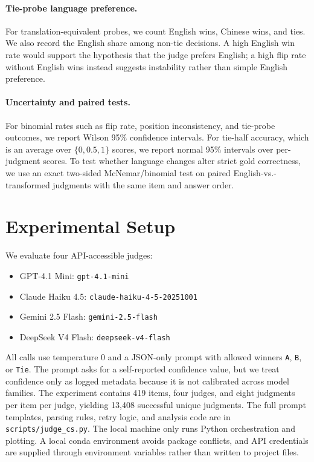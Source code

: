 \documentclass[10pt,twocolumn]{article}
\begin{document}
\paragraph{Tie-probe language preference.}
For translation-equivalent probes, we count English wins, Chinese wins, and ties. We also record the English share among non-tie decisions. A high English win rate would support the hypothesis that the judge prefers English; a high flip rate without English wins instead suggests instability rather than simple English preference.

\paragraph{Uncertainty and paired tests.}
For binomial rates such as flip rate, position inconsistency, and tie-probe outcomes, we report Wilson 95\% confidence intervals. For tie-half accuracy, which is an average over $\{0,0.5,1\}$ scores, we report normal 95\% intervals over per-judgment scores. To test whether language changes alter strict gold correctness, we use an exact two-sided McNemar/binomial test on paired English-vs.-transformed judgments with the same item and answer order.

\section{Experimental Setup}

We evaluate four API-accessible judges:
\begin{itemize}
    \item GPT-4.1 Mini: \texttt{gpt-4.1-mini}
    \item Claude Haiku 4.5: \texttt{claude-haiku-4-5-20251001}
    \item Gemini 2.5 Flash: \texttt{gemini-2.5-flash}
    \item DeepSeek V4 Flash: \texttt{deepseek-v4-flash}
\end{itemize}

All calls use temperature 0 and a JSON-only prompt with allowed winners \texttt{A}, \texttt{B}, or \texttt{Tie}. The prompt asks for a self-reported confidence value, but we treat confidence only as logged metadata because it is not calibrated across model families. The experiment contains 419 items, four judges, and eight judgments per item per judge, yielding 13,408 successful unique judgments. The full prompt templates, parsing rules, retry logic, and analysis code are in \texttt{scripts/judge\_cs.py}. The local machine only runs Python orchestration and plotting. A local conda environment avoids package conflicts, and API credentials are supplied through environment variables rather than written to project files.
\end{document}
